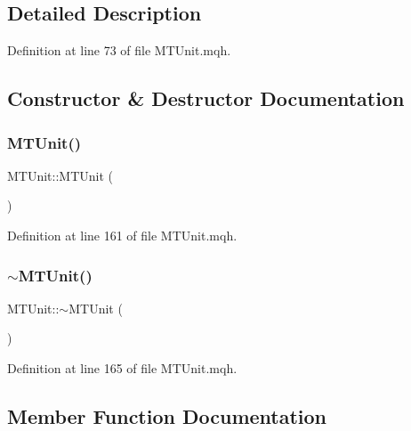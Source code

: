 \subsection{Detailed Description}


Definition at line 73 of file M\+T\+Unit.\+mqh.



\subsection{Constructor \& Destructor Documentation}
\mbox{\label{class_m_t_unit_a1256e3e0b1c57479036f10a817c887e2}} 
\subsubsection{\texorpdfstring{M\+T\+Unit()}{MTUnit()}}
{\footnotesize\ttfamily M\+T\+Unit\+::\+M\+T\+Unit (\begin{DoxyParamCaption}{ }\end{DoxyParamCaption})}



Definition at line 161 of file M\+T\+Unit.\+mqh.

\mbox{\label{class_m_t_unit_a36199d28fffea660a4f0b481907f225f}} 
\subsubsection{\texorpdfstring{$\sim$\+M\+T\+Unit()}{~MTUnit()}}
{\footnotesize\ttfamily M\+T\+Unit\+::$\sim$\+M\+T\+Unit (\begin{DoxyParamCaption}{ }\end{DoxyParamCaption})}



Definition at line 165 of file M\+T\+Unit.\+mqh.



\subsection{Member Function Documentation}
\mbox{\label{class_m_t_unit_a46a6d6e4c695d4acc94a17e39c3a2f4e}} 
